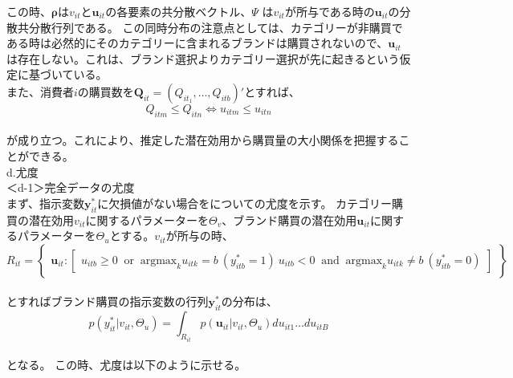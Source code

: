 \documentclass[11pt]{jsarticle}
\begin{document}
この時、${\boldsymbol \rho}$は$v_{it}$と$\textbf{u}_{it}$の各要素の共分散ベクトル、$\Psi$ は$v_{it}$が所与である時の$\textbf{u}_{it}$の分散共分散行列である。
この同時分布の注意点としては、カテゴリーが非購買である時は必然的にそのカテゴリーに含まれるブランドは購買されないので、$\textbf{u}_{it}$は存在しない。これは、ブランド選択よりカテゴリー選択が先に起きるという仮定に基づいている。\\
また、消費者$i$の購買数を$\textbf{Q}_{it} = (Q_{it_{1}}, \ldots, Q_{itb})'$とすれば、 \\
\begin{equation}
Q_{itm} \leq Q_{itn} \iff u_{itm} \leq u_{itn}
\end{equation}\\
が成り立つ。これにより、推定した潜在効用から購買量の大小関係を把握することができる。
\\
d.尤度\\
＜d-1＞完全データの尤度\\
まず、指示変数$\textbf{y}_{it}^{*}$に欠損値がない場合をについての尤度を示す。
カテゴリー購買の潜在効用$v_{it}$に関するパラメーターを$\Theta_{v}$、ブランド購買の潜在効用$\textbf{u}_{it}$に関するパラメーターを$\Theta_{u}$とする。$v_{it}$が所与の時、 \\
\begin{equation} \label{formulad1}
R_{it} = 
\begin{Bmatrix}
\textbf{u}_{it} : 
\begin{bmatrix}
u_{itb} \geq 0 \;\; \mbox{or} \;\; \mbox{argmax}_{k}u_{itk} = b \
(y^\ast_{itb} = 1) \
u_{itb} < 0 \;\; \mbox{and} \;\; \mbox{argmax}_{k}u_{itk} \neq b \
(y^\ast_{itb} = 0)
\end{bmatrix}
\end{Bmatrix}
\end{equation}\\
とすればブランド購買の指示変数の行列$\textbf{y}_{it}^{*}$の分布は、\\
\begin{equation} \label{formulad2}
p(y^\ast_{it} | v_{it}, \Theta_{u}) = \int_{R_{it}} p(\textbf{u}_{it} | v_{it}, \Theta_{u}) du_{it1} \ldots du_{itB}
\end{equation}\\
となる。
この時、尤度は以下のように示せる。
\end{document}
